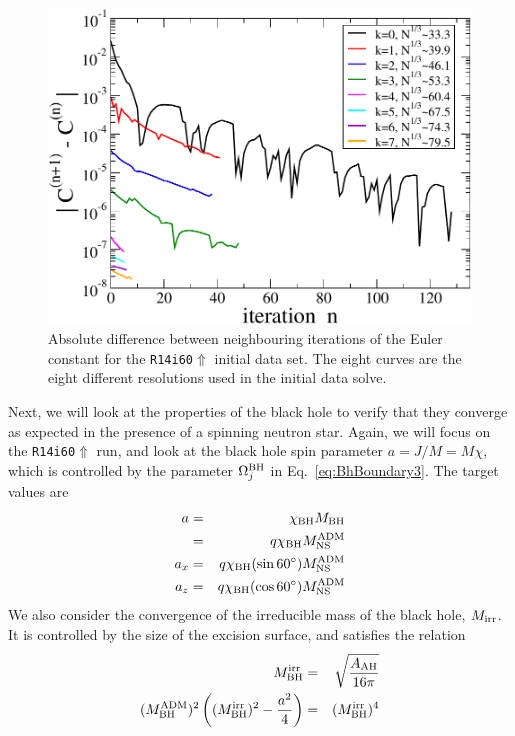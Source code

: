 \begin{figure}
\includegraphics[width=0.95\columnwidth]{chap4/EulerConv}
\caption[Convergence of the Euler constant for the {\tt
  R1460$\Uparrow$}]{\label{Fig:EulerConv}
Absolute difference between neighbouring iterations of the Euler
constant for the {\tt R14i60$\Uparrow$} initial data set. The eight
curves are the eight different resolutions
used in the initial data solve.}
\end{figure}

Next, we will look at the properties of the black hole to verify that they converge as expected in the presence of a spinning neutron star. Again, we will focus on the {\tt R14i60$\Uparrow$} run, and look at the black hole spin parameter $a=J/M=M\chi$, which is controlled by the parameter $\Omega_j^{\rm BH}$ in Eq.~\ref{eq:BhBoundary3}. The target values are
\begin{eqnarray}
a&=&\chi_{\rm BH}M_{\rm BH}\\
&=&q\chi_{\rm BH}M_{\rm NS}^{\rm ADM}\\
a_x&=&q\chi_{\rm BH}(\sin60^{\circ})M_{\rm NS}^{\rm ADM}\\
a_z&=&q\chi_{\rm BH}(\cos60^{\circ})M_{\rm NS}^{\rm ADM}
\end{eqnarray}
We also consider the convergence of the irreducible mass of the black hole, $M_{\rm irr}$. It is controlled by the size of the excision surface, and satisfies the relation
\begin{eqnarray}
M_{\rm BH}^{\rm irr}&=&\sqrt{\frac{A_{\rm AH}}{16\pi}}\\
(M_{\rm BH}^{\rm ADM})^2\left((M_{\rm BH}^{\rm irr})^2-\frac{a^2}{4}\right)&=&(M_{\rm BH}^{\rm irr})^4
\end{eqnarray}

